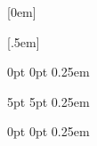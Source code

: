 [0em] %
{\sffamily\small} %
{\contentslabel[\thecontentslabel]{1.25cm}} %
{}
{}

[.5em] %
{\normalfont\footnotesize\sffamily} %
{}
{}
{}



%
\usepackage{siunitx}

\newcommand{\intoo}[2]{\mathopen{]}#1\,;#2\mathclose{[}}
\newcommand{\ud}{\mathop{\mathrm{{}d}}\mathopen{}}
\newcommand{\intff}[2]{\mathopen{[}#1\,;#2\mathclose{]}}
\newtheorem{notation}{Notation}[chapter]

{0pt}%
{0pt}%
{\normalfont}%
{}%
{\small\bf\sffamily\color{ocre}}%
{\;}%
{0.25em}%
{\small\sffamily\color{ocre}\nobreakspace{}%
} %
\renewcommand{\qedsymbol}{$\blacksquare$}%

{5pt}%
{5pt}%
{\normalfont}%
{} %
{\small\bf\sffamily}%
{\;}%
{0.25em}%
{\small\sffamily{\tiny\ensuremath{\blacksquare}}\nobreakspace{}\nobreakspace{}%
}%

{0pt}%
{0pt}%
{\normalfont}%
{}%
{\small\bf\sffamily}%
{\;}%
{0.25em}%
{\small\sffamily{}\nobreakspace{}%
}%

